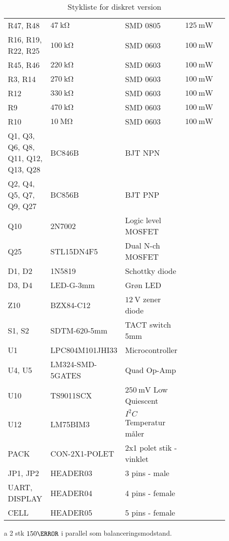 \begin{table}[h!]
\begin{threeparttable}
\begin{tabular}{p{0.25\linewidth}p{0.2\linewidth}p{0.25\linewidth}p{0.15\linewidth}p{0.05\linewidth}}
R47, R48 & $\SI{47}{\kilo\ohm}$ & SMD 0805 & $\SI{125}{\milli\watt}$  \\
R16, R19, R22, R25 & $\SI{100}{\kilo\ohm}$ & SMD 0603 & $\SI{100}{\milli\watt}$  \\
R45, R46 & $\SI{220}{\kilo\ohm}$ & SMD 0603 & $\SI{100}{\milli\watt}$  \\
R3, R14 & $\SI{270}{\kilo\ohm}$ & SMD 0603 & $\SI{100}{\milli\watt}$  \\
R12 & $\SI{330}{\kilo\ohm}$ & SMD 0603 & $\SI{100}{\milli\watt}$  \\
R9 & $\SI{470}{\kilo\ohm}$ & SMD 0603 & $\SI{100}{\milli\watt}$  \\
R10 & $\SI{10}{\mega\ohm}$ & SMD 0603 & $\SI{100}{\milli\watt}$  \\
\midrule

Q1, Q3, Q6, Q8, Q11, Q12, Q13, Q28 & BC846B & BJT NPN &   \\
Q2, Q4, Q5, Q7, Q9, Q27 & BC856B & BJT PNP &   \\
Q10 & 2N7002 & Logic level MOSFET &   \\
Q25 & STL15DN4F5 & Dual N-ch MOSFET &   \\

\midrule
D1, D2 & 1N5819 & Schottky diode &   \\
D3, D4 & LED-G-3mm  & Grøn LED &   \\
Z10 & BZX84-C12 & $\SI{12}{\volt}$ zener diode&   \\
S1, S2 & SDTM-620-5mm  & TACT switch 5mm &   \\
U1 & LPC804M101JHI33 & Microcontroller &   \\
U4, U5 & LM324-SMD-5GATES & Quad Op-Amp &   \\
U10 & TS9011SCX & $\SI{250}{\milli\volt}$ Low Quiescent &   \\
U12 & LM75BIM3 & $I^{2}C$ Temperatur måler &   \\
PACK & CON-2X1-POLET & 2x1 polet stik - vinklet &   \\
JP1, JP2 & HEADER03 & 3 pins - male &   \\
UART, DISPLAY & HEADER04 & 4 pins - female &   \\
CELL & HEADER05 & 5 pins - female &   \\

\hline
\bottomrule
\end{tabular}
\begin{tablenotes}
\item[a] 2 stk $150\ohm$ i parallel som balanceringsmodstand.
\end{tablenotes}
\end{threeparttable}
\caption{Stykliste for diskret version}
\end{table} 
